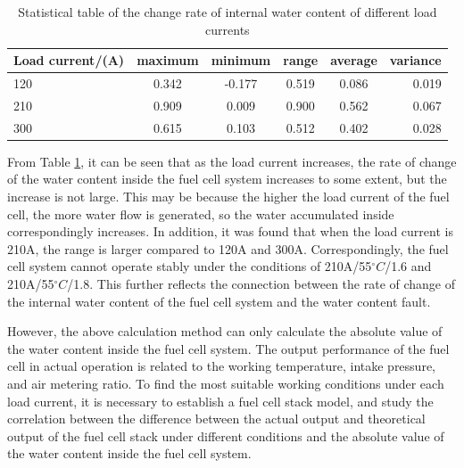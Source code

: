 \begin{table}
	\centering
	\begin{center}
		\caption{Statistical table of the change rate of internal water content of different load currents}
		\label{tab:StatisticalTable}
		\begin{tabular}{l|c|c|c|c|r}
			\hline
			\textbf{Load current/(A)} & \textbf{maximum} & \textbf{minimum} & \textbf{range} & \textbf{average} & \textbf{variance} \\
			\hline
			120                       & 0.342            & -0.177           & 0.519          & 0.086            & 0.019             \\
			210                       & 0.909            & 0.009            & 0.900          & 0.562            & 0.067             \\
			300                       & 0.615            & 0.103            & 0.512          & 0.402            & 0.028             \\
			\hline
		\end{tabular}
	\end{center}
\end{table}
From Table \ref{tab:StatisticalTable}, it can be seen that as the load current increases, the rate of change of the water content inside the fuel cell system increases to some extent, but the increase is not large. This may be because the higher the load current of the fuel cell, the more water flow is generated, so the water accumulated inside correspondingly increases. In addition, it was found that when the load current is 210A, the range is larger compared to 120A and 300A. Correspondingly, the fuel cell system cannot operate stably under the conditions of 210A/55$^{\circ}C$/1.6 and 210A/55$^{\circ}C$/1.8. This further reflects the connection between the rate of change of the internal water content of the fuel cell system and the water content fault.
\par
However, the above calculation method can only calculate the absolute value of the water content inside the fuel cell system. The output performance of the fuel cell in actual operation is related to the working temperature, intake pressure, and air metering ratio. To find the most suitable working conditions under each load current, it is necessary to establish a fuel cell stack model, and study the correlation between the difference between the actual output and theoretical output of the fuel cell stack under different conditions and the absolute value of the water content inside the fuel cell system.
